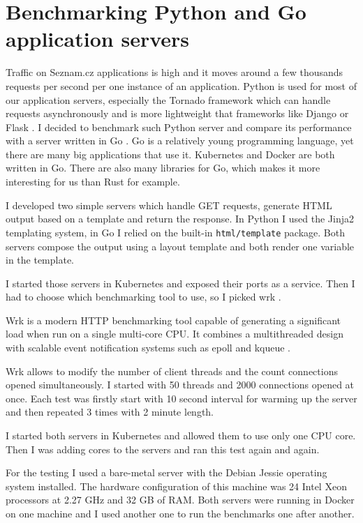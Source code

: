 \chapter{Benchmarking Python and Go application servers}

Traffic on Seznam.cz applications is high and it moves around a few thousands requests per second per one instance of an application. Python \cite{python} is used for most of our application servers, especially the Tornado framework \cite{tornado} which can handle requests asynchronously and is more lightweight \cite{flask-django-tornado} that frameworks like Django \cite{django} or Flask \cite{flask}. I decided to benchmark such Python server and compare its performance with a server written in Go \cite{golang}. Go is a relatively young programming language, yet there are many big applications that use it. Kubernetes and Docker are both written in Go. There are also many libraries for Go, which makes it more interesting for us than Rust for example.

I developed two simple servers which handle GET requests, generate HTML output based on a template and return the response. In Python I used the Jinja2 \cite{jinja2} templating system, in Go I relied on the built-in \lstinline{html/template} package. Both servers compose the output using a layout template and both render one variable in the template.

I started those servers in Kubernetes and exposed their ports as a service. Then I had to choose which benchmarking tool to use, so I picked wrk \cite{wrk}.
 
Wrk is a modern HTTP benchmarking tool capable of generating a significant load when run on a single multi-core CPU. It combines a multithreaded design with scalable event notification systems such as epoll and kqueue \cite{wrk}.

Wrk allows to modify the number of client threads and the count connections opened simultaneously. I started with 50 threads and 2000 connections opened at once. Each test was firstly start with 10 second interval for warming up the server and then repeated 3 times with 2 minute length.

I started both servers in Kubernetes and allowed them to use only one CPU core. Then I was adding cores to the servers and ran this test again and again.

For the testing I used a bare-metal server with the Debian Jessie operating system installed. The hardware configuration of this machine was 24 Intel Xeon processors at 2.27 GHz and 32 GB of RAM. Both servers were running in Docker on one machine and I used another one to run the benchmarks one after another.

